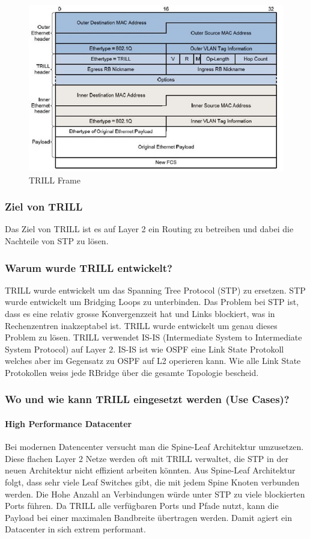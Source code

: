 \begin{figure}[h]
\centering
\includegraphics[width=0.6\linewidth]{images/trill_header}
\caption{TRILL Frame}
\label{fig:trillheader}
\end{figure}

\subsubsection{Ziel von TRILL} %
Das Ziel von TRILL ist es auf Layer 2 ein Routing zu betreiben und dabei die Nachteile von STP zu lösen.

\subsubsection{Warum wurde TRILL entwickelt?} %
TRILL wurde entwickelt um das Spanning Tree Protocol (STP) zu ersetzen. STP wurde entwickelt um Bridging Loops zu unterbinden. Das Problem bei STP ist, dass es eine relativ grosse Konvergenzzeit hat und Links blockiert, was in Rechenzentren inakzeptabel ist. TRILL wurde entwickelt um genau dieses Problem zu lösen. TRILL verwendet IS-IS (Intermediate System to Intermediate System Protocol) auf Layer 2. IS-IS ist wie OSPF eine Link State Protokoll welches aber im Gegensatz zu OSPF auf L2 operieren kann. Wie alle Link State Protokollen weiss jede RBridge über die gesamte Topologie bescheid. 

\subsubsection{Wo und wie kann TRILL eingesetzt werden (Use Cases)?} %


\paragraph{High Performance Datacenter}
Bei modernen Datencenter versucht man die Spine-Leaf Architektur umzusetzen. Diese flachen Layer 2 Netze werden oft mit TRILL verwaltet, die STP in der neuen Architektur nicht effizient arbeiten könnten. Aus Spine-Leaf Architektur folgt, dass sehr viele Leaf Switches gibt, die mit jedem Spine Knoten verbunden werden. Die Hohe Anzahl an Verbindungen würde unter STP zu viele blockierten Ports führen.  Da TRILL alle verfügbaren Ports und Pfade nutzt, kann die Payload bei einer maximalen Bandbreite übertragen werden. Damit agiert ein Datacenter in sich extrem performant. 

